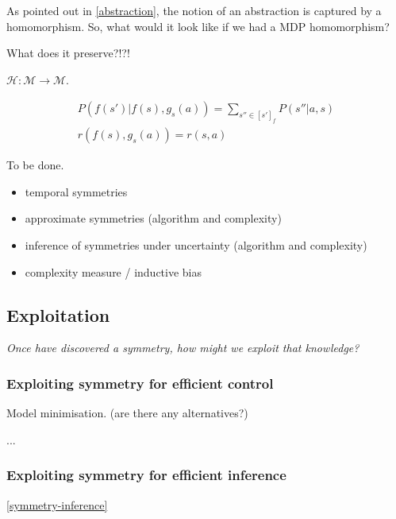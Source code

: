 \vspace{5mm}

As pointed out in \ref{abstraction}, the notion of an abstraction is captured by a homomorphism.
So, what would it look like if we had a MDP homomorphism?

What does it preserve?!?!

\cite{Ravindran2002}

$\mathcal H: \mathcal M\to \mathcal M$.

\begin{align}
P(f(s')|f(s), g_s(a)) = \sum_{s''\in [s']_f} P(s''| a, s) \\
r(f(s), g_s(a)) = r(s, a)
\end{align}


To be done.

\begin{itemize}
\tightlist
  \item temporal symmetries
  \item approximate symmetries (algorithm and complexity)
  \item inference of symmetries under uncertainty (algorithm and complexity)
  \item complexity measure / inductive bias
\end{itemize}

\subsection{Exploitation}

\begin{displayquote}
\textit{Once have discovered a symmetry, how might we exploit that knowledge?}
\end{displayquote}

\subsubsection{Exploiting symmetry for efficient control}


Model minimisation. (are there any alternatives?)

...\cite{NARAYANAMURTHY}

\subsubsection{Exploiting symmetry for efficient inference}

\cite{Chen2019}
\ref{symmetry-inference}

